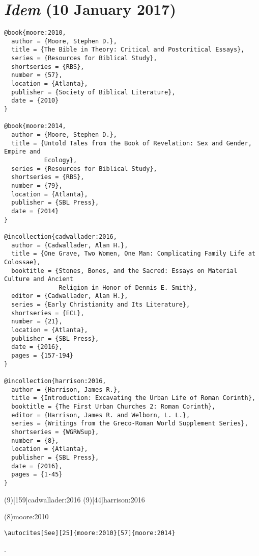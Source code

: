 \documentclass[a4paper]{article}
\begin{document}
\section{\emph{Idem} (10 January 2017)}

\begin{verbatim}
@book{moore:2010,
  author = {Moore, Stephen D.},
  title = {The Bible in Theory: Critical and Postcritical Essays},
  series = {Resources for Biblical Study},
  shortseries = {RBS},
  number = {57},
  location = {Atlanta},
  publisher = {Society of Biblical Literature},
  date = {2010}
}

@book{moore:2014,
  author = {Moore, Stephen D.},
  title = {Untold Tales from the Book of Revelation: Sex and Gender, Empire and
           Ecology},
  series = {Resources for Biblical Study},
  shortseries = {RBS},
  number = {79},
  location = {Atlanta},
  publisher = {SBL Press},
  date = {2014}
}

@incollection{cadwallader:2016,
  author = {Cadwallader, Alan H.},
  title = {One Grave, Two Women, One Man: Complicating Family Life at Colossae},
  booktitle = {Stones, Bones, and the Sacred: Essays on Material Culture and Ancient
               Religion in Honor of Dennis E. Smith},
  editor = {Cadwallader, Alan H.},
  series = {Early Christianity and Its Literature},
  shortseries = {ECL},
  number = {21},
  location = {Atlanta},
  publisher = {SBL Press},
  date = {2016},
  pages = {157-194}
}

@incollection{harrison:2016,
  author = {Harrison, James R.},
  title = {Introduction: Excavating the Urban Life of Roman Corinth},
  booktitle = {The First Urban Churches 2: Roman Corinth},
  editor = {Harrison, James R. and Welborn, L. L.},
  series = {Writings from the Greco-Roman World Supplement Series},
  shortseries = {WGRWSup},
  number = {8},
  location = {Atlanta},
  publisher = {SBL Press},
  date = {2016},
  pages = {1-45}
}
\end{verbatim}

\begin{fverbcite}{8}
  \autocites{moore:2010}{moore:2014}
\end{fverbcite}
\examplecite(9)[159]{cadwallader:2016}
\examplecite(9)[44]{harrison:2016}
\begin{verbcite}
  \citereset
\end{verbcite}
\examplecite(8){moore:2010}
\begin{Verbatim}[formatcom=\color{cmdcolour}]
\autocites[See][25]{moore:2010}[57]{moore:2014}
\end{Verbatim}
.\space\strut\cites[See][25]{moore:2010}[57]{moore:2014}
\exampleabbreviations
\examplebibliography
{}
\end{document}
